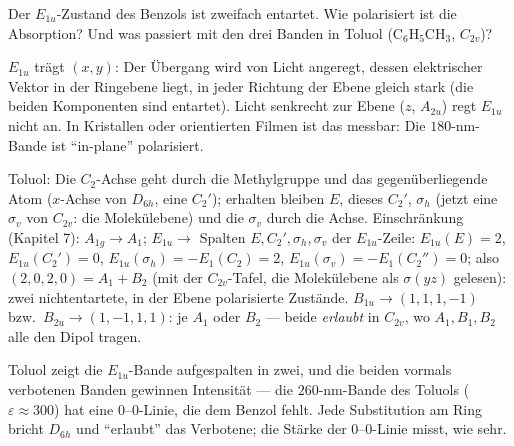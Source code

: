 \begin{aufgabe}
Der $E_{1u}$-Zustand des Benzols ist zweifach entartet. Wie polarisiert ist die Absorption? Und was passiert mit den drei Banden in Toluol ($\mathrm{C_6H_5CH_3}$, $C_{2v}$)?

\loesung
{}
$E_{1u}$ trägt $(x, y)$: Der Übergang wird von Licht angeregt, dessen elektrischer Vektor in der Ringebene liegt, in jeder Richtung der Ebene gleich stark (die beiden Komponenten sind entartet). Licht senkrecht zur Ebene ($z$, $A_{2u}$) regt $E_{1u}$ nicht an. In Kristallen oder orientierten Filmen ist das messbar: Die $180$-nm-Bande ist \enquote{in-plane} polarisiert.

Toluol: Die $C_2$-Achse geht durch die Methylgruppe und das gegenüberliegende Atom ($x$-Achse von $D_{6h}$, eine $C_2'$); erhalten bleiben $E$, dieses $C_2'$, $\sigma_h$ (jetzt eine $\sigma_v$ von $C_{2v}$: die Molekülebene) und die $\sigma_v$ durch die Achse. Einschränkung (Kapitel 7): $A_{1g}\to A_1$; $E_{1u}\to$ Spalten $E, C_2', \sigma_h, \sigma_v$ der $E_{1u}$-Zeile: $E_{1u}(E) = 2$, $E_{1u}(C_2') = 0$, $E_{1u}(\sigma_h) = -E_1(C_2) = 2$, $E_{1u}(\sigma_v) = -E_1(C_2'') = 0$; also $(2, 0, 2, 0) = A_1 + B_2$ (mit der $C_{2v}$-Tafel, die Molekülebene als $\sigma(yz)$ gelesen): zwei nichtentartete, in der Ebene polarisierte Zustände. $B_{1u}\to(1, 1, 1, -1)$ bzw.\ $B_{2u}\to(1, -1, 1, 1)$: je $A_1$ oder $B_2$ --- beide \emph{erlaubt} in $C_{2v}$, wo $A_1, B_1, B_2$ alle den Dipol tragen.

Toluol zeigt die $E_{1u}$-Bande aufgespalten in zwei, und die beiden vormals verbotenen Banden gewinnen Intensität --- die $260$-nm-Bande des Toluols ($\varepsilon\approx300$) hat eine $0$--$0$-Linie, die dem Benzol fehlt. Jede Substitution am Ring bricht $D_{6h}$ und \enquote{erlaubt} das Verbotene; die Stärke der $0$--$0$-Linie misst, wie sehr.

\begin{center}
\begin{minipage}{0.88\textwidth}
\end{minipage}
\end{center}
\end{aufgabe}

